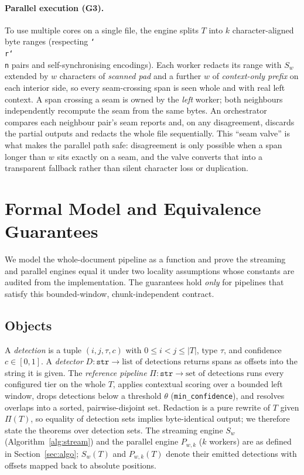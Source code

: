 \documentclass[runningheads]{llncs}
\newcommand{\T}{T}
\newcommand{\Pipe}{\Pi}
\newcommand{\Sw}{S_{w}}
\newcommand{\Pwk}{P_{w,k}}
\begin{document}
\paragraph{Parallel execution (G3).}
To use multiple cores on a single file, the engine splits $\T$ into $k$
character-aligned byte ranges (respecting \texttt{\char`\\r\char`\\n} pairs and
self-synchronising encodings). Each worker redacts its range with $\Sw$ extended
by $w$ characters of \emph{scanned pad} and a further $w$ of \emph{context-only
prefix} on each interior side, so every seam-crossing span is seen whole and with
real left context. A span crossing a seam is owned by the \emph{left} worker; both
neighbours independently recompute the seam from the same bytes. An orchestrator
compares each neighbour pair's seam reports and, on any disagreement, discards the
partial outputs and redacts the whole file sequentially. This ``seam valve'' is
what makes the parallel path safe: disagreement is only possible when a span longer
than $w$ sits exactly on a seam, and the valve converts that into a transparent
fallback rather than silent character loss or duplication.

\section{Formal Model and Equivalence Guarantees}
\label{sec:formal}

We model the whole-document pipeline as a function and prove the streaming and
parallel engines equal it under two locality assumptions whose constants are
audited from the implementation. The guarantees hold \emph{only} for pipelines
that satisfy this bounded-window, chunk-independent contract.

\subsection{Objects}
A \emph{detection} is a tuple $(i,j,\tau,c)$ with $0\le i<j\le|\T|$, type $\tau$,
and confidence $c\in[0,1]$. A \emph{detector} $D:\texttt{str}\to
\text{list of detections}$ returns spans as offsets into the string it is given.
The \emph{reference pipeline} $\Pipe:\texttt{str}\to\text{set of detections}$
runs every configured tier on the whole $\T$, applies contextual scoring over a
bounded left window, drops detections below a threshold $\theta$
(\texttt{min\_confidence}), and resolves overlaps into a sorted, pairwise-disjoint
set. Redaction is a pure rewrite of $\T$ given $\Pipe(\T)$, so equality of
detection sets implies byte-identical output; we therefore state the theorems over
detection sets. The streaming engine $\Sw$ (Algorithm~\ref{alg:stream}) and the
parallel engine $\Pwk$ ($k$ workers) are as defined in Section~\ref{sec:algo};
$\Sw(\T)$ and $\Pwk(\T)$ denote their emitted detections with offsets mapped back
to absolute positions.
\end{document}
